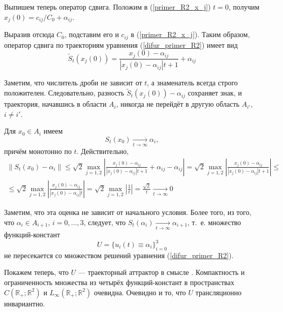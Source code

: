 Выпишем теперь оператор сдвига.
Положим в (\ref{primer_R2_x_j}) $t=0$, получим
$
	x_j(0) = c_{ij}/{C_0}+\alpha_{ij}
$.

Выразив отсюда $C_0$, подставим его и $c_{ij}$ в (\ref{primer_R2_x_j}).
Таким образом, оператор сдвига по траекториям уравнения (\ref{difur_primer_R2}) имеет вид
\begin{equation}\label{primer_R2_oper_sdviga}
	\tilde{S}_t(x_{j}(0)) = \frac{x_{j}(0)-\alpha_{ij}}{|x_{j}(0)-\alpha_{ij}|t+1}+\alpha_{ij}
\end{equation}

Заметим, что числитель дроби не зависит от $t$, а знаменатель всегда строго положителен.
Следовательно, разность $\tilde{S}_t(x_j(0)) - \alpha_{ij}$ сохраняет знак,
и траектория, начавшись в области $A_i$, никогда не перейдёт в другую область $A_{i'}$, $i \neq i'$.

Для $x_0 \in A_i$ имеем
\begin{equation}\label{primer_R2_stremlenie}
	S_t(x_0) \xrightarrow[t \to \infty]{} \alpha_{i},
\end{equation}
причём монотонно по $t$.
Действительно,
\begin{multline}
	\label{oper_sdviga_estimation}
	\|S_t(x_0) - \alpha_i\| \leq
	\sqrt{2} \max_{j=1,2} \left| \frac{x_{j}(0)-\alpha_{ij}}{|x_{j}(0)-\alpha_{ij}|t+1} + \alpha_{ij} - \alpha_{ij}  \right| =
	\sqrt{2} \max_{j=1,2} \left| \frac{x_{j}(0)-\alpha_{ij}}{|x_{j}(0)-\alpha_{ij}|t+1} \right| \leq
	\\ \leq
	\sqrt{2} \max_{j=1,2} \left| \frac{x_{j}(0)-\alpha_{ij}}{|x_{j}(0)-\alpha_{ij}|t} \right| =
	\sqrt{2} \max_{j=1,2} \left| \frac{1}{t} \right| =
	\frac{\sqrt{2}}{t} \xrightarrow[t \to \infty]{} 0
\end{multline}

Заметим, что эта оценка не зависит от начального условия.
Более того, из того, что $\alpha_i \in A_{i+1}$, $i=0,...,3$,
следует, что $S_t(\alpha_i) \xrightarrow[t \to \infty]{} \alpha_{i+1}$,
т.~е. множество функций-констант
$$
	U = \{ u_i(t) \equiv \alpha_i \}_{i=0}^{3}
$$
не пересекается со множеством решений уравнения (\ref{difur_primer_R2}).

Покажем теперь, что $U$ --- траекторный аттрактор в смысле \cite{Kondratyev}.
Компактность и ограниченность множества из четырёх функций-констант в пространствах
$C(\mathbb{R}_+; \mathbb{R}^2)$ и $L_\infty(\mathbb{R}_+; \mathbb{R}^2)$ очевидна.
Очевидно и то, что $U$ трансляционно инвариантно.

